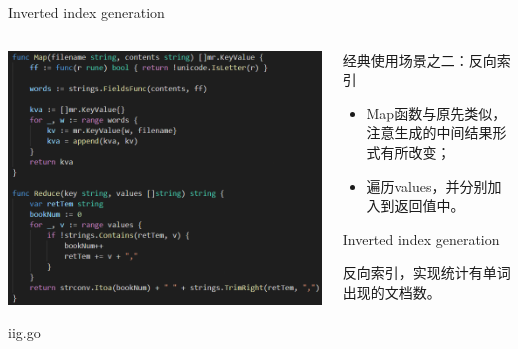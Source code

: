 \begin{frame}{Inverted index generation}
	
	\begin{columns}
		\begin{column}{0.5\textwidth}
			\centerline{\includegraphics[width = 1.1\textwidth]{Figures/iig.png}}
			\centerline{iig.go
			}
		\end{column}
		
		\begin{column}{0.5\textwidth}
			\begin{CJK}{UTF8}{gkai}
				经典使用场景之二：反向索引
			\end{CJK}
			\begin{itemize}
				\item \begin{CJK}{UTF8}{gkai}
					Map函数与原先类似，\alert{注意生成的中间结果形式有所改变}；
				\end{CJK}
				
				\item \begin{CJK}{UTF8}{gkai}
					遍历values，并分别加入到返回值中。
				\end{CJK}
				
			\end{itemize}
			\begin{block}{Inverted index generation}
				\begin{CJK}{UTF8}{gkai}
					反向索引，实现统计有单词出现的文档数。
				\end{CJK}
			\end{block}
		\end{column}
		
		
	\end{columns}
	
\end{frame}

